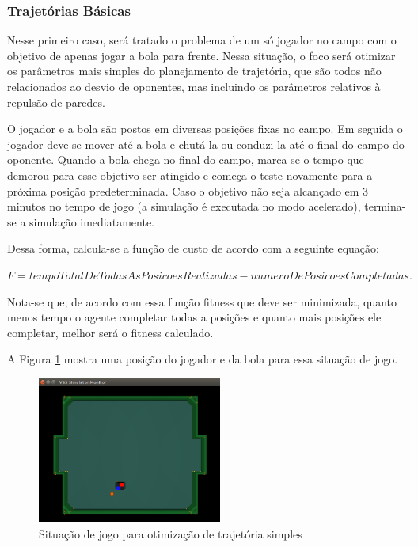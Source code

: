 \documentclass[10pt,fleqn,a4paper]{article}
\begin{document}
\subsubsection{Trajetórias Básicas}

Nesse primeiro caso, será tratado o problema de um só jogador no campo com o objetivo de apenas jogar a bola para frente. Nessa situação, o foco será otimizar os parâmetros mais simples do planejamento de trajetória, que são todos não relacionados ao desvio de oponentes, mas incluindo os parâmetros relativos à repulsão de paredes.

O jogador e a bola são postos em diversas posições fixas no campo. Em seguida o jogador deve se mover até a bola e chutá-la ou conduzi-la até o final do campo do oponente. Quando a bola chega no final do campo, marca-se o tempo que demorou para esse objetivo ser atingido e começa o teste novamente para a próxima posição predeterminada. Caso o objetivo não seja alcançado em 3 minutos no tempo de jogo (a simulação é executada no modo acelerado), termina-se a simulação imediatamente.

Dessa forma, calcula-se a função de custo de acordo com a seguinte equação:

$ F = tempoTotalDeTodasAsPosicoesRealizadas - numeroDePosicoesCompletadas. $
 
Nota-se que, de acordo com essa função fitness que deve ser minimizada, quanto menos tempo o agente completar todas a posições e quanto mais posições ele completar, melhor será o fitness calculado.

A Figura \ref{fig:sem_obstaculo_simulacao} mostra uma posição do jogador e da bola para essa situação de jogo.

\begin{figure}[H]
	\centering
	\includegraphics[width=0.54\textwidth]{figures/OtimizacaoSemObstaculoSimulacao.png}
	\caption{Situação de jogo para otimização de trajetória simples}
	\label{fig:sem_obstaculo_simulacao}
\end{figure}
\end{document}
